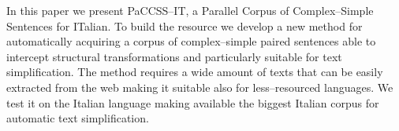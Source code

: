 In this paper we present PaCCSS--IT, a Parallel Corpus of Complex--Simple Sentences for ITalian. To build the resource we develop a new method for automatically acquiring a corpus of complex--simple paired sentences able to intercept structural transformations and particularly suitable for text simplification. The method requires a wide amount of texts that can be easily extracted from the web making it suitable also for less--resourced languages. We test it on the Italian language making available the biggest Italian corpus for automatic text simplification.
